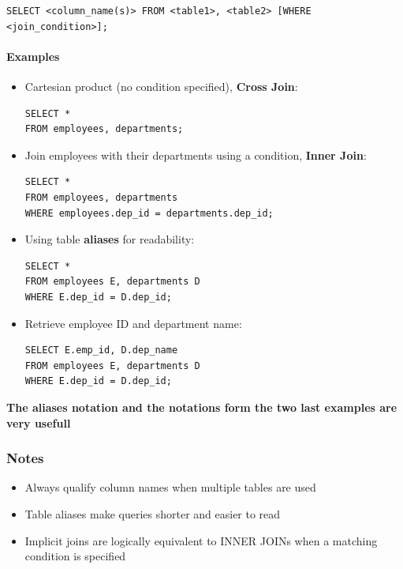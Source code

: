 \documentclass{article}
\begin{document}
\begin{FormulaBox}
\texttt{SELECT <column\_name(s)> FROM <table1>, <table2> [WHERE <join\_condition>];}
\end{FormulaBox}

\paragraph{Examples}

\begin{itemize}
    \item Cartesian product (no condition specified), \textbf{Cross Join}:
\begin{verbatim}
SELECT *
FROM employees, departments;
\end{verbatim}

    \item Join employees with their departments using a condition, \textbf{Inner Join}:
\begin{verbatim}
SELECT *
FROM employees, departments
WHERE employees.dep_id = departments.dep_id;
\end{verbatim}

    \item Using table \textbf{aliases} for readability:
\begin{verbatim}
SELECT *
FROM employees E, departments D
WHERE E.dep_id = D.dep_id;
\end{verbatim}

    \item Retrieve employee ID and department name:
\begin{verbatim}
SELECT E.emp_id, D.dep_name
FROM employees E, departments D
WHERE E.dep_id = D.dep_id;
\end{verbatim}
\end{itemize}
\textbf{The aliases notation and the notations form the two last examples are very usefull}
\subsubsection{Notes}

\begin{itemize}
    \item Always qualify column names when multiple tables are used
    \item Table aliases make queries shorter and easier to read
    \item Implicit joins are logically equivalent to INNER JOINs when a matching condition is specified
\end{itemize}
\end{document}
